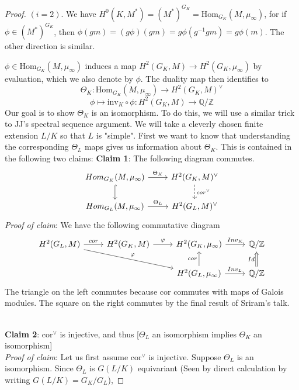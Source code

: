 \documentclass[class=article, crop=false]{standalone}
\begin{document}
\begin{proof}
$(i=2)$. We have $H^0(K,M^*)=(M^*)^{G_K}=\text{Hom}_{G_K}(M, \mu_{\infty})$, for if $\phi \in (M^*)^{G_K}$, then $\phi(gm)=(g\phi)(gm)=g\phi(g^{-1}gm)=g\phi(m)$. The other direction is similar.
\par 
$\phi \in \text{Hom}_{G_K}(M,\mu_{\infty})$ induces a map $H^2(G_K,M) \to H^2(G_K,\mu_{\infty})$ by evaluation, which we also denote by $\phi$. The duality map then identifies to
\[\Theta_K:\text{Hom}_{G_K}(M, \mu_{\infty}) \to H^2(G_K,M)^{\vee}\]
\[\phi \mapsto \text{inv}_K\circ \phi :H^2(G_K,M)\to \mathbb{Q}/\mathbb{Z}\]
Our goal is to show $\Theta_K$ is an isomorphism. To do this, we will use a similar trick to JJ's spectral sequence argument. We will take a cleverly chosen finite extension $L/K$ so that $L$ is "simple". First we want to know that understanding the corresponding $\Theta_L$ maps gives us information about $\Theta_K$. This is contained in the following two claims:
\vskip 5pt
\textbf{Claim 1}: The following diagram commutes.
\[\begin{tikzcd}
{Hom_{G_K}(M,\mu_{\infty})} \arrow[r, "\Theta_K"] \arrow[d, hook] & {H^2(G_K, M)^{\vee}} \arrow[d, "cor^{\vee}", dashed] \\
{Hom_{G_L}(M,\mu_{\infty})} \arrow[r, "\Theta_L"]                 & {H^2(G_L,M)^{\vee}}                                 
\end{tikzcd}\]
\textit{Proof of claim}: We have the following commutative diagram
\[\begin{tikzcd}
{H^2(G_L,M) } \arrow[rrd, "\varphi"] \arrow[r, "cor"] & {H^2(G_K,M)} \arrow[r, "\varphi"] & {H^2(G_K,\mu_{\infty})} \arrow[r, "Inv_K"]                    & \mathbb{Q}/\mathbb{Z}                             \\
                                                      &                                   & {H^2(G_L,\mu_{\infty})} \arrow[r, "Inv_L"] \arrow[u, "cor"] & \mathbb{Q}/\mathbb{Z} \arrow[u, "Id", Rightarrow]
\end{tikzcd}\]
The triangle on the left commutes because cor commutes with maps of Galois modules. The square on the right commutes by the final result of Sriram's talk.
\par 
\mbox{}\hfill \qedsymbol
\\
\textbf{Claim 2}: $\text{cor}^{\vee}$ is injective, and thus [$\Theta_L$ an isomorphism implies $\Theta_K$ an isomorphism]
\\
\textit{Proof of claim}: Let us first assume cor$^{\vee}$ is injective. Suppose $\Theta_L$ is an isomorphism. Since $\Theta_L$ is $G(L/K)$ equivariant (Seen by direct calculation by writing $G(L/K)=G_K/G_L$),

\end{proof}
\end{document}
